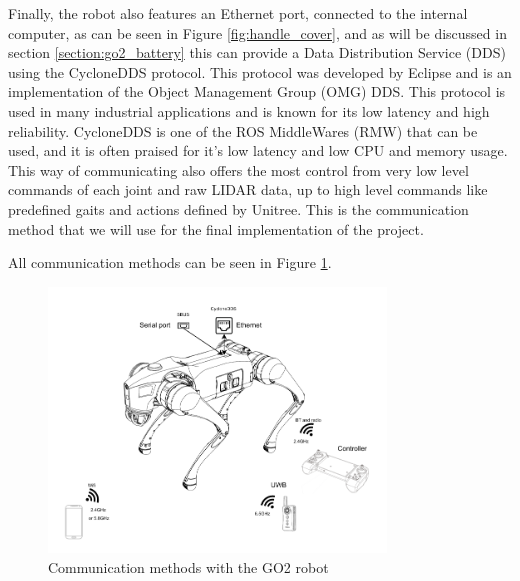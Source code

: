 \documentclass[12pt]{article}
\begin{document}
        Finally, the robot also features an Ethernet port, connected to the internal computer, as can be seen in Figure \ref{fig:handle_cover}, and as will be discussed in section \ref{section:go2_battery} this can provide a Data Distribution Service (DDS) using the CycloneDDS protocol. This protocol was developed by Eclipse and is an implementation of the Object Management Group (OMG) DDS. This protocol is used in many industrial applications and is known for its low latency and high reliability. CycloneDDS is one of the ROS MiddleWares (RMW) that can be used, and it is often praised for it's low latency and low CPU and memory usage. This way of communicating also offers the most control from very low level commands of each joint and raw LIDAR data, up to high level commands like predefined gaits and actions defined by Unitree. This is the communication method that we will use for the final implementation of the project.

        All communication methods can be seen in Figure \ref{fig:go2_communication}.
    

        \begin{figure}[H]
            \centering
            \includegraphics[width=0.8\textwidth]{Images/go2-communication.pdf}
            \caption{Communication methods with the GO2 robot}
            \label{fig:go2_communication}
        \end{figure}

        
\end{document}
